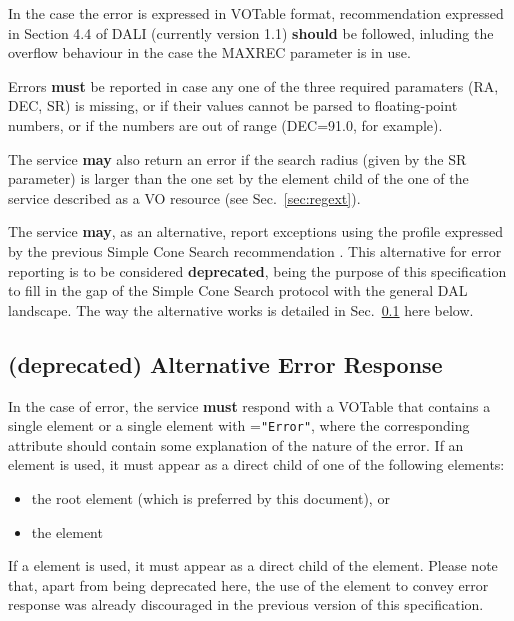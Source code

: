 \documentclass[11pt,a4paper]{ivoa}
\begin{document}
In the case the error is expressed in VOTable format, recommendation
expressed in Section 4.4 of DALI (currently version 1.1) \textbf{should}
be followed, inluding the overflow behaviour in the case the MAXREC
parameter is in use.

Errors \textbf{must} be reported in case any one of the three required
paramaters (RA, DEC, SR) is missing, or if their values cannot be parsed
to floating-point numbers, or if the numbers are out of range (DEC=91.0,
for example). 

The service \textbf{may} also return an error if the search radius
(given by the SR parameter) is larger than the one set by the
 element child of the  one of the service
described as a VO resource (see Sec.~\ref{sec:regext}).

The service \textbf{may}, as an alternative, report exceptions using the
profile expressed by the previous Simple Cone Search recommendation
\citep[v1.03]{std:SCS}. This alternative for error reporting is to be
considered \textbf{deprecated}, being the purpose of this specification
to fill in the gap of the Simple Cone Search protocol with the general
DAL landscape. The way the alternative works is detailed in
Sec.~\ref{subsec:err103} here below.

\subsection{(\textbf{deprecated}) Alternative Error Response}
\label{subsec:err103} In the case of error, the service \textbf{must}
respond with a VOTable that contains a single  element or a
single  element with =\texttt{"Error"}, where
the corresponding  attribute should contain some
explanation of the nature of the error. If an  element is
used, it must appear as a direct child of one of the following elements:
\begin{itemize} \item the root  element (which is
preferred by this document), or \item the  element
\end{itemize}

If a  element is used, it must appear as a direct child of
the  element.
Please note
that, apart from being deprecated here, the use of the 
element to convey error response was already discouraged in the previous
version of this specification.
\end{document}

